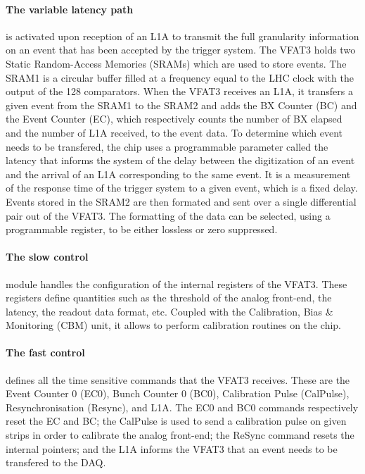       \paragraph{The variable latency path} is activated upon reception of an L1A to transmit the full granularity information on an event that has been accepted by the trigger system. The VFAT3 holds two Static Random-Access Memories (SRAMs) which are used to store events. The SRAM1 is a circular buffer filled at a frequency equal to the LHC clock with the output of the 128 comparators. When the VFAT3 receives an L1A, it transfers a given event from the SRAM1 to the SRAM2 and adds the BX Counter (BC) and the Event Counter (EC), which respectively counts the number of BX elapsed and the number of L1A received, to the event data. To determine which event needs to be transfered, the chip uses a programmable parameter called the latency that informs the system of the delay between the digitization of an event and the arrival of an L1A corresponding to the same event. It is a measurement of the response time of the trigger system to a given event, which is a fixed delay. Events stored in the SRAM2 are then formated and sent over a single differential pair out of the VFAT3. The formatting of the data can be selected, using a programmable register, to be either lossless or zero suppressed. \\

      \paragraph{The slow control} module handles the configuration of the internal registers of the VFAT3. These registers define quantities such as the threshold of the analog front-end, the latency, the readout data format, etc. Coupled with the Calibration, Bias \& Monitoring (CBM) unit, it allows to perform calibration routines on the chip. \\

      \paragraph{The fast control} defines all the time sensitive commands that the VFAT3 receives. These are the Event Counter 0 (EC0), Bunch Counter 0 (BC0), Calibration Pulse (CalPulse), Resynchronisation (Resync), and L1A. The EC0 and BC0 commands respectively reset the EC and BC; the CalPulse is used to send a calibration pulse on given strips in order to calibrate the analog front-end; the ReSync command resets the internal pointers; and the L1A informs the VFAT3 that an event needs to be transfered to the DAQ.

